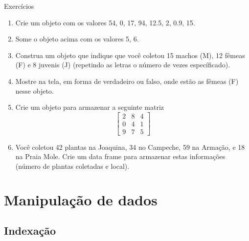 \documentclass[10pt,handout]{beamer}\usepackage[]{graphicx}\usepackage[]{color}
\begin{document}
\begin{frame}[fragile]{Exercícios}
  \begin{enumerate}
  \item Crie um objeto com os valores 54, 0, 17, 94, 12.5, 2, 0.9, 15.
  \item Some o objeto acima com os valores 5, 6.
  \item Construa um objeto que indique que você coletou 15 machos (M),
    12 fêmeas (F) e 8 juvenis (J) (repetindo as letras o número de vezes
    específicado).
  \item Mostre na tela, em forma de verdadeiro ou falso, onde estão as
    fêmeas (F) nesse objeto.
  \item Crie um objeto para armazenar a seguinte matriz
    \[ \left[ \begin{array}{ccc}
        2 & 8 & 4 \\
        0 & 4 & 1 \\
        9 & 7 & 5
      \end{array} \right] \]
  \item Você coletou 42 plantas na Joaquina, 34 no Campeche, 59 na
    Armação, e 18 na Praia Mole. Crie um data frame para armazenar estas
    informações (número de plantas coletadas e local).
  \end{enumerate}
\end{frame}

\section{Manipulação de dados}

\subsection{Indexação}
\end{document}
